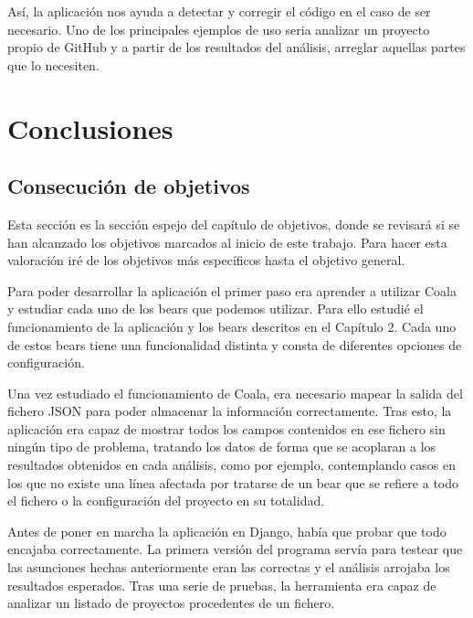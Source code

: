 \documentclass[a4paper, 12pt]{book}
\begin{document}
Así, la aplicación nos ayuda a detectar y corregir el código en el caso de ser necesario. Uno de los principales ejemplos de uso seria analizar un proyecto propio de GitHub y a partir de los resultados del análisis, arreglar aquellas partes que lo necesiten.


\cleardoublepage
\chapter{Conclusiones}
\label{chap:conclusiones}


\section{Consecución de objetivos}
\label{sec:consecucion-objetivos}

Esta sección es la sección espejo del capítulo de objetivos, donde se revisará si se han alcanzado los objetivos marcados al inicio de este trabajo. Para hacer esta valoración iré de los objetivos más específicos hasta el objetivo general.

Para poder desarrollar la aplicación el primer paso era aprender a utilizar Coala y estudiar cada uno de los bears que podemos utilizar. Para ello estudié el funcionamiento de la aplicación y los bears descritos en el Capítulo 2. Cada uno de estos bears tiene una funcionalidad distinta y consta de diferentes opciones de configuración.

Una vez estudiado el funcionamiento de Coala, era necesario mapear la salida del fichero JSON para poder almacenar la información correctamente. Tras esto, la aplicación era capaz de mostrar todos los campos contenidos en ese fichero sin ningún tipo de problema, tratando los datos de forma que se acoplaran a los resultados obtenidos en cada análisis, como por ejemplo, contemplando casos en los que no existe una línea afectada por tratarse de un bear que se refiere a todo el fichero o la configuración del proyecto en su totalidad.

Antes de poner en marcha la aplicación en Django, había que probar que todo encajaba correctamente. La primera versión del programa servía para testear que las asunciones hechas anteriormente eran las correctas y el análisis arrojaba los resultados esperados. Tras una serie de pruebas, la herramienta era capaz de analizar un listado de proyectos procedentes de un fichero.
\end{document}
